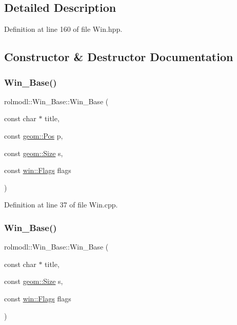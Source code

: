 \subsection{Detailed Description}


Definition at line 160 of file Win.\+hpp.



\subsection{Constructor \& Destructor Documentation}
\mbox{\label{classrolmodl_1_1_win___base_a3ff14fcd3028c11faaaa4dc2b70de9ac}} 
\subsubsection{\texorpdfstring{Win\_Base()}{Win\_Base()}\hspace{0.1cm}{\footnotesize\ttfamily [1/6]}}
{\footnotesize\ttfamily rolmodl\+::\+Win\+\_\+\+Base\+::\+Win\+\_\+\+Base (\begin{DoxyParamCaption}\item[{const char $\ast$}]{title,  }\item[{const \mbox{\hyperlink{structrolmodl_1_1geom_1_1_pos}{geom\+::\+Pos}}}]{p,  }\item[{const \mbox{\hyperlink{structrolmodl_1_1geom_1_1_size}{geom\+::\+Size}}}]{s,  }\item[{const \mbox{\hyperlink{structrolmodl_1_1win_1_1_flags}{win\+::\+Flags}}}]{flags }\end{DoxyParamCaption})}



Definition at line 37 of file Win.\+cpp.

\mbox{\label{classrolmodl_1_1_win___base_aaa9e04d7aa993555afbdf34ab3fd92f0}} 
\subsubsection{\texorpdfstring{Win\_Base()}{Win\_Base()}\hspace{0.1cm}{\footnotesize\ttfamily [2/6]}}
{\footnotesize\ttfamily rolmodl\+::\+Win\+\_\+\+Base\+::\+Win\+\_\+\+Base (\begin{DoxyParamCaption}\item[{const char $\ast$}]{title,  }\item[{const \mbox{\hyperlink{structrolmodl_1_1geom_1_1_size}{geom\+::\+Size}}}]{s,  }\item[{const \mbox{\hyperlink{structrolmodl_1_1win_1_1_flags}{win\+::\+Flags}}}]{flags }\end{DoxyParamCaption})}



